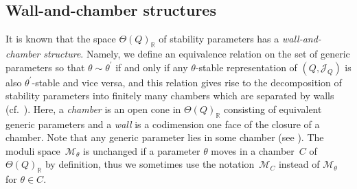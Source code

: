 \documentclass[pdftex]{sigma}
\numberwithin{equation}{section}
\theoremstyle{definition}
\newcommand{\RR}{\mathbb{R}}
\newcommand{\calJ}{\mathcal{J}}
\newcommand{\calM}{\mathcal{M}}
\begin{document}
\subsection{Wall-and-chamber structures}
\label{subsec_wall_chamber}

It is known that the space $\Theta(Q)_\RR$ of stability parameters has a \emph{wall-and-chamber structure}.
Namely, we define an equivalence relation on the set of generic parameters so that $\theta\sim \theta^\prime$
if and only if any $\theta$-stable representation of $(Q,\calJ_Q)$ is also $\theta^\prime$-stable and vice versa,
and this relation gives rise to the decomposition of stability parameters into finitely many chambers which are separated by walls (cf.\ \cite{DH_GIT, thadd_GIT}).
Here, a \emph{chamber} is an open cone in $\Theta(Q)_\RR$ consisting of equivalent generic parameters
and a \emph{wall} is a codimension one face of the closure of a chamber.
Note that any generic parameter lies in some chamber (see \cite[Lemma~6.1]{IU_anycrepant}).
The moduli space~$\calM_\theta$ is unchanged if a parameter $\theta$ moves in a chamber~$C$ of $\Theta(Q)_\RR$ by definition,
thus we sometimes use the notation~$\calM_C$ instead of $\calM_\theta$ for $\theta\in C$.
\end{document}
